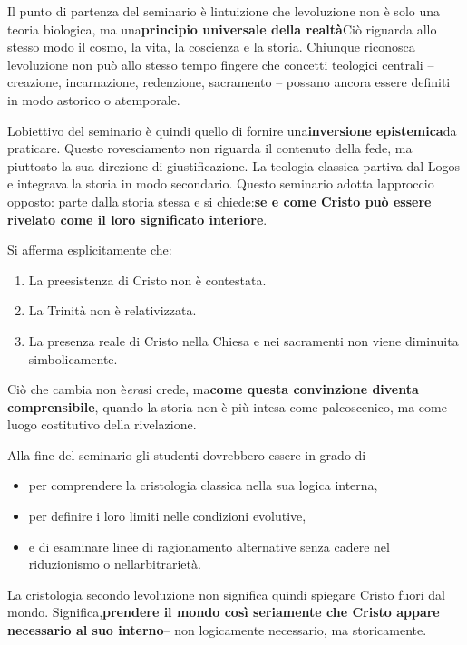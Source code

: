 \documentclass[
]{article}
\begin{document}
Il punto di partenza del seminario è l\textquotesingle intuizione che l\textquotesingle evoluzione non è solo una teoria biologica, ma una\textbf{principio universale della realtà}Ciò riguarda allo stesso modo il cosmo, la vita, la coscienza e la storia. Chiunque riconosca l\textquotesingle evoluzione non può allo stesso tempo fingere che concetti teologici centrali -- creazione, incarnazione, redenzione, sacramento -- possano ancora essere definiti in modo astorico o atemporale.

L\textquotesingle obiettivo del seminario è quindi quello di fornire una\textbf{inversione epistemica}da praticare. Questo rovesciamento non riguarda il contenuto della fede, ma piuttosto la sua direzione di giustificazione. La teologia classica partiva dal Logos e integrava la storia in modo secondario. Questo seminario adotta l\textquotesingle approccio opposto: parte dalla storia stessa e si chiede:\textbf{se e come Cristo può essere rivelato come il loro significato interiore}.

Si afferma esplicitamente che:

\begin{enumerate}
\def\labelenumi{\arabic{enumi}.}
\setcounter{enumi}{6}
\item
  La preesistenza di Cristo non è contestata.
\item
  La Trinità non è relativizzata.
\item
  La presenza reale di Cristo nella Chiesa e nei sacramenti non viene diminuita simbolicamente.
\end{enumerate}

Ciò che cambia non è\emph{era}si crede, ma\textbf{come questa convinzione diventa comprensibile}, quando la storia non è più intesa come palcoscenico, ma come luogo costitutivo della rivelazione.

Alla fine del seminario gli studenti dovrebbero essere in grado di

\begin{itemize}
\item
  per comprendere la cristologia classica nella sua logica interna,
\item
  per definire i loro limiti nelle condizioni evolutive,
\item
  e di esaminare linee di ragionamento alternative senza cadere nel riduzionismo o nell\textquotesingle arbitrarietà.
\end{itemize}

La cristologia secondo l\textquotesingle evoluzione non significa quindi spiegare Cristo fuori dal mondo. Significa,\textbf{prendere il mondo così seriamente che Cristo appare necessario al suo interno}-- non logicamente necessario, ma storicamente.
\end{document}
